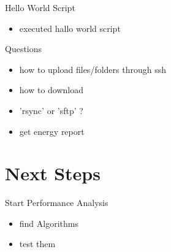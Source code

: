 \documentclass[11pt,aspectratio=169]{beamer}
\begin{document}
\begin{frame}{Hello World Script}
  \begin{itemize}
    \item executed hallo world script
  \end{itemize}
  
\end{frame}


\begin{frame}{Questions}
  \begin{itemize}
    \item how to upload files/folders through ssh
    \item how to download
    \item 'rsync' or 'sftp' ?
    \item get energy report
  \end{itemize}
\end{frame}

\section{Next Steps}

\begin{frame}{Start Performance Analysis}
  \begin{itemize}
    \item find Algorithms
    \item test them
  \end{itemize}
\end{frame}


\appendix
\end{document}
